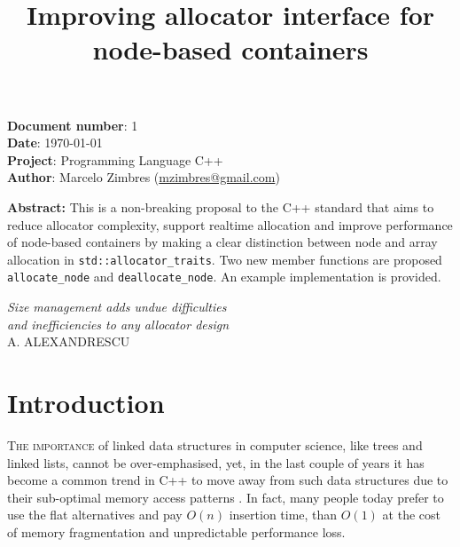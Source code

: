 \documentclass[11pt]{article}
\begin{document}
\date{}
\title{\bf Improving allocator interface for node-based containers}

\vspace{-2cm}
\maketitle


\noindent
{\bf Document number}:  1 \\
{\bf Date}:  \today \\
{\bf Project}: Programming Language C++ \\
{\bf Author}: Marcelo Zimbres (\href{mailto:mzimbres@gmail.com}{mzimbres@gmail.com}) 

\vspace{1cm}

\noindent
{\bf Abstract: }This is a non-breaking proposal to the C++ standard that aims
to reduce allocator complexity, support realtime allocation and improve
performance of node-based containers by making a clear distinction between node
and array allocation in \texttt{std::allocator\_traits}.  Two new member
functions are proposed \texttt{allocate\_node} and \texttt{deallocate\_node}.
An example implementation is provided.

\tableofcontents

\vfill
\begin{flushright}
\noindent
{\it Size management adds undue difficulties \\
     and inefficiencies to any allocator design} \\
A. ALEXANDRESCU \\
\medskip
{\it }
\end{flushright}
\medskip

\section{Introduction}
\textsc{The importance} of linked data structures in computer science, like
trees and linked lists, cannot be over-emphasised, yet, in the last couple of
years it has become a common trend in C++ to move away from such data
structures due to their sub-optimal memory access patterns \cite{middleditch,
chandler, meyers}.  In fact, many people today prefer to use the flat
alternatives and pay $O(n)$ insertion time, than $O(1)$ at the cost of memory
fragmentation and unpredictable performance loss.  
\end{document}
